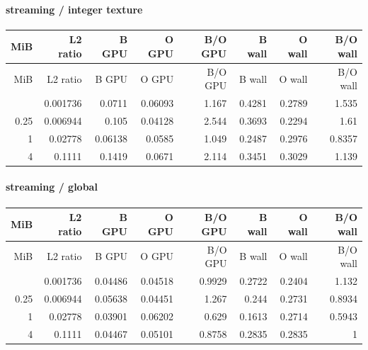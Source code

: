 \paragraph{streaming / integer texture}

\begingroup
\scriptsize
\setlength{\tabcolsep}{2.5pt}
\renewcommand{\arraystretch}{1.16}
\begin{longtable}{rrrrrrrr}
\toprule
MiB & L2 ratio & B GPU & O GPU & B/O GPU & B wall & O wall & B/O wall \\
\midrule\endfirsthead
\toprule
MiB & L2 ratio & B GPU & O GPU & B/O GPU & B wall & O wall & B/O wall \\
\midrule\endhead
\bottomrule\endfoot
0.0625 & 0.001736 & 0.0711 & 0.06093 & 1.167 & 0.4281 & 0.2789 & 1.535 \\
0.25 & 0.006944 & 0.105 & 0.04128 & 2.544 & 0.3693 & 0.2294 & 1.61 \\
1 & 0.02778 & 0.06138 & 0.0585 & 1.049 & 0.2487 & 0.2976 & 0.8357 \\
4 & 0.1111 & 0.1419 & 0.0671 & 2.114 & 0.3451 & 0.3029 & 1.139 \\
\end{longtable}
\endgroup


\paragraph{streaming / global}

\begingroup
\scriptsize
\setlength{\tabcolsep}{2.5pt}
\renewcommand{\arraystretch}{1.16}
\begin{longtable}{rrrrrrrr}
\toprule
MiB & L2 ratio & B GPU & O GPU & B/O GPU & B wall & O wall & B/O wall \\
\midrule\endfirsthead
\toprule
MiB & L2 ratio & B GPU & O GPU & B/O GPU & B wall & O wall & B/O wall \\
\midrule\endhead
\bottomrule\endfoot
0.0625 & 0.001736 & 0.04486 & 0.04518 & 0.9929 & 0.2722 & 0.2404 & 1.132 \\
0.25 & 0.006944 & 0.05638 & 0.04451 & 1.267 & 0.244 & 0.2731 & 0.8934 \\
1 & 0.02778 & 0.03901 & 0.06202 & 0.629 & 0.1613 & 0.2714 & 0.5943 \\
4 & 0.1111 & 0.04467 & 0.05101 & 0.8758 & 0.2835 & 0.2835 & 1 \\
\end{longtable}
\endgroup


